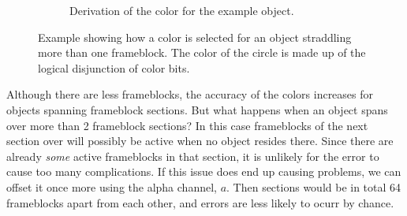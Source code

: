 \documentclass[conference]{IEEEtran}
\begin{document}
\begin{figure}[h!]
\begin{subfigure}{.5\textwidth}
\begin{center}
\end{center}
\end{subfigure}
\par\bigskip
\begin{subfigure}{.5\textwidth}
\begin{center}
\begin{minipage}[t]{\linewidth}
\hspace{0.225\linewidth}
\caption{Derivation of the color for the example object.}
\label{fig:object_color}
\end{minipage}
\end{center}
\end{subfigure}
\caption{Example showing how a color is selected for an object straddling more than one frameblock.
The color of the circle is made up of the logical disjunction of color bits.}
\label{fig:example}
\end{figure}

Although there are less frameblocks, the accuracy of the colors increases for objects spanning frameblock sections.
But what happens when an object spans over more than 2 frameblock sections?
In this case frameblocks of the next section over will possibly be active when no object resides there.
Since there are already \textit{some} active frameblocks in that section, it is unlikely for the error to cause
too many complications.
If this issue does end up causing problems, we can offset it once more using the alpha channel, $a$.
Then sections would be in total 64 frameblocks apart from each other, and errors are less likely to ocurr by chance.
\end{document}
